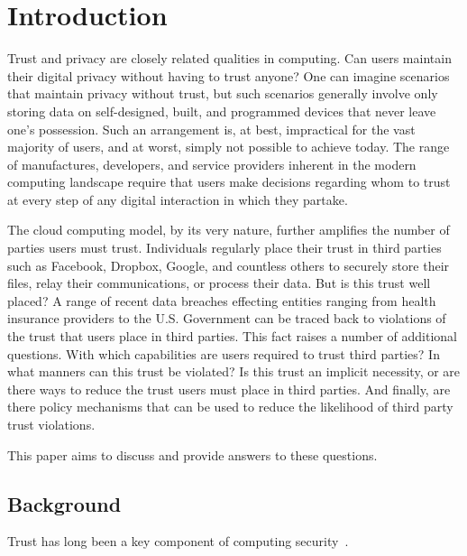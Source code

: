 \section{Introduction}
\label{sec:intro}

Trust and privacy are closely related qualities in computing. Can
users maintain their digital privacy without having to trust anyone?
One can imagine scenarios that maintain privacy without trust, but
such scenarios generally involve only storing data on self-designed,
built, and programmed devices that never leave one's possession. Such
an arrangement is, at best, impractical for the vast majority of
users, and at worst, simply not possible to achieve today. The range
of manufactures, developers, and service providers inherent in the
modern computing landscape require that users make decisions regarding
whom to trust at every step of any digital interaction in which they
partake.

The cloud computing model, by its very nature, further amplifies the
number of parties users must trust. Individuals regularly place their
trust in third parties such as Facebook, Dropbox, Google, and
countless others to securely store their files, relay their
communications, or process their data. But is this trust well placed?
A range of recent data breaches effecting entities ranging from health
insurance providers to the U.S. Government can be traced back to
violations of the trust that users place in third parties. This fact
raises a number of additional questions. With which capabilities are
users required to trust third parties? In what manners can this trust
be violated? Is this trust an implicit necessity, or are there ways to
reduce the trust users must place in third parties. And finally, are
there policy mechanisms that can be used to reduce the likelihood of
third party trust violations.

This paper aims to discuss and provide answers to these questions.

\subsection{Background}

Trust has long been a key component of computing
security~\cite{thompson1984}.
